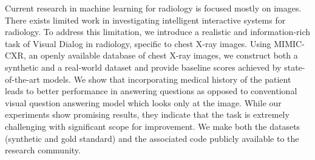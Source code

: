Current research in machine learning for radiology is focused mostly on images. There exists limited work in investigating intelligent interactive systems for radiology. To address this limitation, we introduce a realistic and information-rich task of Visual Dialog in radiology, specific to chest X-ray images. Using MIMIC-CXR, an openly available database of chest X-ray images, we construct both a synthetic and a real-world dataset and provide baseline scores achieved by state-of-the-art models. We show that incorporating medical history of the patient leads to better performance in answering questions as opposed to conventional visual question answering model which looks only at the image. While our experiments show promising results, they indicate that the task is extremely challenging with significant scope for improvement. We make both the datasets (synthetic and gold standard) and the associated code publicly available to the research community.
